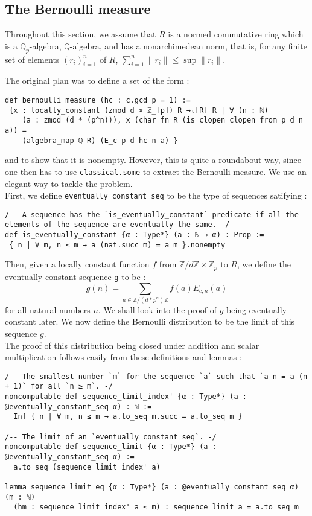 \documentclass[11pt]{article}
\newcommand{\lean}[1]{\texttt{#1}\xspace} %
\begin{document}
\subsection{The Bernoulli measure}
Throughout this section, we assume that $R$ is a normed commutative ring which is a $\mathbb{Q}_p$-algebra, 
$\mathbb{Q}$-algebra, and has a nonarchimedean norm, that is, for any finite set of elements 
$(r_i)_{i = 1}^n$ of $R$, $\sum_{i = 1}^n \parallel r_i \parallel \le \sup \parallel r_i \parallel$.

The original plan was to define a set of the form : 
\begin{lstlisting}
def bernoulli_measure (hc : c.gcd p = 1) :=
 {x : locally_constant (zmod d × ℤ_[p]) R →ₗ[R] R | ∀ (n : ℕ) 
    (a : zmod (d * (p^n))), x (char_fn R (is_clopen_clopen_from p d n a)) = 
    (algebra_map ℚ R) (E_c p d hc n a) }
\end{lstlisting}

and to show that it is nonempty. However, this is quite a roundabout way, since one then has to use 
\lean{classical.some} to extract the Bernoulli measure. We use an elegant way to tackle the problem. \\

First, we define \lean{eventually\_constant\_seq} to be the type of sequences satifying : 
\begin{lstlisting}
/-- A sequence has the `is_eventually_constant` predicate if all the elements of the sequence are eventually the same. -/
def is_eventually_constant {α : Type*} (a : ℕ → α) : Prop :=
 { n | ∀ m, n ≤ m → a (nat.succ m) = a m }.nonempty
\end{lstlisting}

Then, given a locally constant function $f$ from $\mathbb{Z}/d \mathbb{Z} \times \mathbb{Z}_p$ to $R$, 
we define the eventually constant sequence \lean{g} to be : 
$$ g(n) = \sum_{a \in \mathbb{Z}/(d*p^n) \mathbb{Z}} f(a) E_{c, n}(a) $$ 
for all natural numbers $n$. We shall look into the proof of $g$ being eventually constant later. We now define the Bernoulli 
distribution to be the limit of this sequence $g$. \\

The proof of this distribution being closed under addition and scalar multiplication follows easily from these definitions and lemmas : 
\begin{lstlisting}
/-- The smallest number `m` for the sequence `a` such that `a n = a (n + 1)` for all `n ≥ m`. -/
noncomputable def sequence_limit_index' {α : Type*} (a : @eventually_constant_seq α) : ℕ :=
  Inf { n | ∀ m, n ≤ m → a.to_seq m.succ = a.to_seq m }

/-- The limit of an `eventually_constant_seq`. -/
noncomputable def sequence_limit {α : Type*} (a : @eventually_constant_seq α) :=
  a.to_seq (sequence_limit_index' a)

lemma sequence_limit_eq {α : Type*} (a : @eventually_constant_seq α) (m : ℕ)
  (hm : sequence_limit_index' a ≤ m) : sequence_limit a = a.to_seq m
\end{lstlisting}
\end{document}
